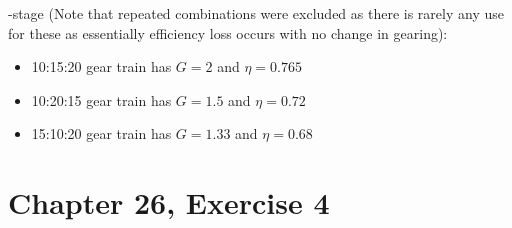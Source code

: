 \documentclass[12pt]{article}
\begin{document}
-stage (Note that repeated combinations were excluded as there is rarely any use for these as essentially efficiency loss occurs with no change in gearing):
\begin{itemize}
    \item 
    10:15:20 gear train has $G=2$ and $\eta = 0.765$

    \item 
    10:20:15 gear train has $G=1.5$ and $\eta = 0.72$

    \item 
    15:10:20 gear train has $G=1.33$ and $\eta = 0.68$
\end{itemize}

\section*{Chapter 26, Exercise 4}
\end{document}
